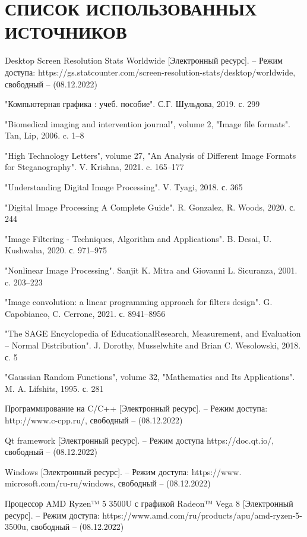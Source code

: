 \section*{СПИСОК ИСПОЛЬЗОВАННЫХ ИСТОЧНИКОВ}

\begingroup
\renewcommand{\section}[2]{}
\begin{thebibliography}{}
	
	Desktop Screen Resolution Stats Worldwide [Электронный ресурс]. – Режим доступа: https://gs.statcounter.com/screen-resolution-stats/desktop/worldwide, свободный – (08.12.2022)  
	
	"Компьютерная графика : учеб. пособие". С.Г. Шульдова, 2019. с. 299
	
	"Biomedical imaging and intervention journal", volume 2, "Image file formats". Tan, Lip, 2006. c. 1--8

	"High Technology Letters", volume 27, "An Analysis of Different Image Formats for Steganography". V. Krishna, 2021. c. 165--177
	
	"Understanding Digital Image Processing". V. Tyagi, 2018. с. 365
	
	"Digital Image Processing A Complete Guide". R. Gonzalez, R. Woods, 2020. с. 244
	
	"Image Filtering - Techniques, Algorithm and Applications". B. Desai, U. Kushwaha, 2020. с. 971--975
	
	"Nonlinear Image Processing". Sanjit K. Mitra and Giovanni L. Sicuranza, 2001. c. 203--223

	"Image convolution: a linear programming approach for filters design". G. Capobianco, C. Cerrone, 2021. с. 8941--8956
	
	"The SAGE Encyclopedia of EducationalResearch, Measurement, and Evaluation -- Normal Distribution". J. Dorothy, Musselwhite and Brian C. Wesolowski, 2018. с. 5
	
	"Gaussian Random Functions", volume 32, "Mathematics and Its Applications". M. A. Lifshits, 1995. с. 281
	
	Программирование на C/C++ [Электронный ресурс]. – Режим доступа: http://www.c-cpp.ru/, свободный – (08.12.2022)
	
	Qt framework [Электронный ресурс]. – Режим доступа https://doc.qt.io/, свободный – (08.12.2022)
	
	Windows [Электронный ресурс]. – Режим доступа: https://www.
	microsoft.com/ru-ru/windows, свободный – (08.12.2022)  
	
	Процессор AMD Ryzen™ 5 3500U с графикой Radeon™ Vega 8 [Электронный ресурс].  – Режим доступа: https://www.amd.com/ru/products/apu/amd-ryzen-5-3500u, свободный – (08.12.2022)
\end{thebibliography}
\endgroup

\pagebreak